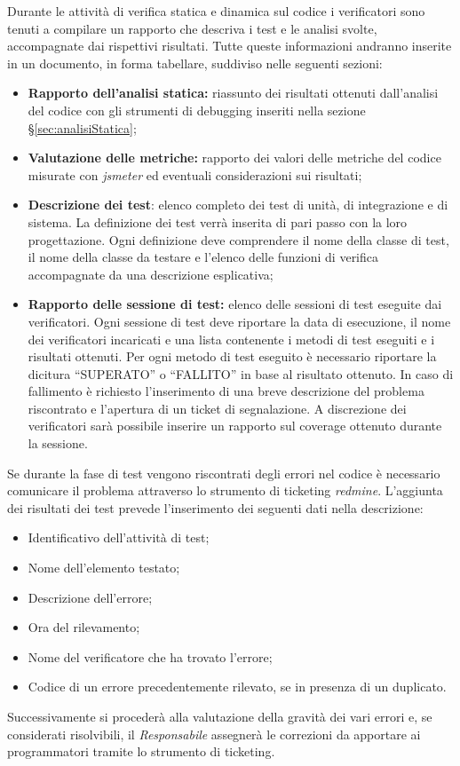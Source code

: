  Durante le attività di verifica statica e dinamica sul codice i verificatori sono tenuti a compilare un rapporto che descriva i test e le analisi svolte, accompagnate dai rispettivi risultati. Tutte queste informazioni andranno inserite in un documento, in forma tabellare, suddiviso nelle seguenti sezioni:
  \begin{itemize}
 \item \textbf{Rapporto dell’analisi statica:} riassunto dei risultati ottenuti dall’analisi del codice con gli strumenti di debugging inseriti nella sezione \S\ref{sec:analisiStatica};
  
  \item \textbf{Valutazione delle metriche:} rapporto dei valori delle metriche del codice misurate con \emph{jsmeter} ed eventuali considerazioni sui risultati;
  \item \textbf{Descrizione dei test}: elenco completo dei test di unità, di integrazione e di sistema. La definizione dei test verrà inserita di pari passo con la loro progettazione.
  Ogni definizione deve comprendere il nome della classe di test, il nome della classe da testare e l’elenco delle funzioni di verifica accompagnate da una descrizione esplicativa;
  \item \textbf{Rapporto delle sessione di test:} elenco delle sessioni di test eseguite dai verificatori. Ogni sessione di test deve riportare la data di esecuzione, il nome dei verificatori incaricati e una lista contenente i metodi di test eseguiti e i risultati ottenuti. Per ogni metodo di test eseguito è necessario riportare la dicitura “SUPERATO” o “FALLITO” in base al risultato ottenuto. In caso
  di fallimento è richiesto l’inserimento di una breve descrizione del problema riscontrato e l’apertura di un ticket di segnalazione. A discrezione dei verificatori sarà possibile inserire un rapporto sul coverage ottenuto durante la sessione.
 \end{itemize} 
  Se durante la fase di test vengono riscontrati degli errori nel codice è necessario comunicare il problema attraverso lo strumento di ticketing \emph{redmine}.
  L’aggiunta dei risultati dei test prevede l’inserimento dei seguenti dati nella  descrizione:
  \begin{itemize}
  \item Identificativo dell’attività di test;
  \item Nome dell’elemento testato;
  \item Descrizione dell’errore;
  \item Ora del rilevamento;
  \item Nome del verificatore che ha trovato l’errore;
  \item Codice di un errore precedentemente rilevato, se in presenza di un duplicato.
 \end{itemize}
  Successivamente si procederà alla valutazione della gravità dei vari errori e, se considerati risolvibili, il \emph{Responsabile} assegnerà le correzioni da apportare ai programmatori tramite lo strumento di ticketing.